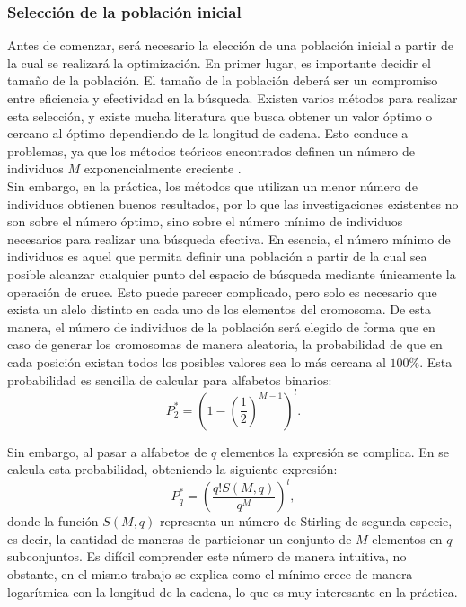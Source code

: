 \subsubsection{Selección de la población inicial}\label{intro:sel-inicial}
Antes de comenzar, será necesario la elección de una población inicial a partir de la cual se realizará la optimización. En primer lugar, es importante decidir el tamaño de la población. El tamaño de la población deberá ser un compromiso entre eficiencia y efectividad en la búsqueda. Existen varios métodos para realizar esta selección, y existe mucha literatura que busca obtener un valor óptimo o cercano al óptimo dependiendo de la longitud de cadena. Esto conduce a problemas, ya que los métodos teóricos encontrados definen un número de individuos $M$ exponencialmente creciente \cite{goldberg1985optimal,goldberg1988sizing}.\\

Sin embargo, en la práctica, los métodos que utilizan un menor número de individuos obtienen buenos resultados, por lo que las investigaciones existentes no son sobre el número óptimo, sino sobre el número mínimo de individuos necesarios para realizar una búsqueda efectiva. En esencia, el número mínimo de individuos es aquel que permita definir una población a partir de la cual sea posible alcanzar cualquier punto del espacio de búsqueda mediante únicamente la operación de cruce. Esto puede parecer complicado, pero solo es necesario que exista un alelo distinto en cada uno de los elementos del cromosoma. De esta manera, el número de individuos de la población será elegido de forma que en caso de generar los cromosomas de manera aleatoria, la probabilidad de que en cada posición existan todos los posibles valores sea lo más cercana al $100\%$. Esta probabilidad es sencilla de calcular para alfabetos binarios:
$$P_2^*=(1-(\frac{1}{2})^{M-1})^l.$$

Sin embargo, al pasar a alfabetos de $q$ elementos la expresión se complica. En \cite{colin-pq} se calcula esta probabilidad, obteniendo la siguiente expresión:
$$P_q^*=\left(\frac{q!S(M,q)}{q^M}\right)^l,$$
donde la función $S(M,q)$ representa un número de Stirling de segunda especie, es decir, la cantidad de maneras de particionar un conjunto de $M$ elementos en $q$ subconjuntos. Es difícil comprender este número de manera intuitiva, no obstante, en el mismo trabajo se explica como el mínimo crece de manera logarítmica con la longitud de la cadena, lo que es muy interesante en la práctica.\\

